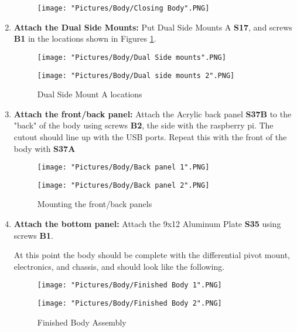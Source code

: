 \documentclass[12pt]{article}
\begin{document}
\begin{enumerate}
\begin{figure}[H]
	\centering
	\texttt{[image: "Pictures/Body/Closing Body".PNG]}
\end{figure}

\item \textbf{Attach the Dual Side Mounts: } Put Dual Side Mounts A \textbf{S17}, and screws \textbf{B1} in the locations shown in Figures \ref{Dual Side Mounts}. 

\begin{figure}[H]
  \centering
  \begin{minipage}[b]{0.40\textwidth}
    \texttt{[image: "Pictures/Body/Dual Side mounts".PNG]}
  \end{minipage}
  \hfill
  \begin{minipage}[b]{0.40\textwidth}
    \texttt{[image: "Pictures/Body/Dual side mounts 2".PNG]}
  \end{minipage}
  \caption{Dual Side Mount A locations}
  \label{Dual Side Mounts}
\end{figure}

\item \textbf{Attach the front/back panel: } Attach the Acrylic back panel \textbf{S37B} to the "back" of the body using screws \textbf{B2}, the side with the raspberry pi. The cutout should line up with the USB ports. Repeat this with the front of the body with \textbf{S37A}

\begin{figure}[H]
  \centering
  \begin{minipage}[b]{0.40\textwidth}
    \texttt{[image: "Pictures/Body/Back panel 1".PNG]}
  \end{minipage}
  \hfill
  \begin{minipage}[b]{0.40\textwidth}
    \texttt{[image: "Pictures/Body/Back panel 2".PNG]}
  \end{minipage}
  \caption{Mounting the front/back panels}
  \label{front/back panels}
\end{figure}

\item \textbf{Attach the bottom panel: } Attach the 9x12 Aluminum Plate \textbf{S35} using screws \textbf{B1}. 

At this point the body should be complete with the differential pivot mount, electronics, and chassis, and should look like the following. 

\begin{figure}[H]
  \centering
  \begin{minipage}[b]{0.45\textwidth}
    \texttt{[image: "Pictures/Body/Finished Body 1".PNG]}
  \end{minipage}
  \hfill
  \begin{minipage}[b]{0.45\textwidth}
    \texttt{[image: "Pictures/Body/Finished Body 2".PNG]}
  \end{minipage}
  \caption{Finished Body Assembly}
\end{figure}

\end{enumerate}
\end{document}
